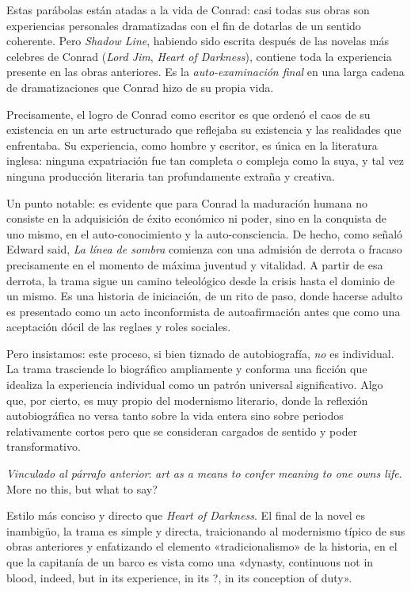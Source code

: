 \documentclass[a4paper, 12pt]{article}
\begin{document}
Estas parábolas están atadas a la vida de Conrad: casi todas sus obras son
experiencias personales dramatizadas con el fin de dotarlas de un sentido
coherente. Pero \textit{Shadow Line}, habiendo sido escrita después de las
novelas más celebres de Conrad (\textit{Lord Jim}, \textit{Heart of Darkness}),
contiene toda la experiencia presente en las obras anteriores. Es la
\textit{auto-examinación final} en una larga cadena de dramatizaciones que
Conrad hizo de su propia vida.

Precisamente, el logro de Conrad como escritor es que ordenó el caos de su
existencia en un arte estructurado que reflejaba su existencia y las realidades
que enfrentaba. Su experiencia, como hombre y escritor, es única en la
literatura inglesa: ninguna expatriación fue tan completa o compleja como la
suya, y tal vez ninguna producción literaria tan profundamente extraña y
creativa.

Un punto notable: es evidente que para Conrad la maduración humana no consiste
en la adquisición de éxito económico ni poder, sino en la conquista de uno
mismo, en el auto-conocimiento y la auto-consciencia. De hecho, como señaló
Edward said, \textit{La línea de sombra} comienza con una admisión de derrota o
fracaso precisamente en el momento de máxima juventud y vitalidad. A partir de
esa derrota, la trama sigue un camino teleológico desde la crisis hasta el
dominio de un mismo. Es una historia de iniciación, de un rito de paso, donde
hacerse adulto es presentado como un acto inconformista de autoafirmación antes
que como una aceptación dócil de las reglaes y roles sociales. 



Pero insistamos: este proceso, si bien tiznado de autobiografía, \textit{no} es
individual. La trama trasciende lo biográfico ampliamente y conforma una ficción
que idealiza la experiencia individual como un patrón universal significativo.
Algo que, por cierto, es muy propio del modernismo literario, donde la reflexión
autobiográfica no versa tanto sobre la vida entera sino sobre periodos
relativamente cortos pero que se consideran cargados de sentido y poder
transformativo.

\textit{Vinculado al párrafo anterior}: \textit{art as a means to confer meaning
to one owns life}. More no this, but what to say?

Estilo más conciso y directo que \textit{Heart of Darkness}. El final de la
novel es inambigüo, la trama es simple y directa, traicionando al modernismo
típico de sus obras anteriores y enfatizando el elemento «tradicionalismo» de la
historia, en el que la capitanía de un barco es vista como una «dynasty,
continuous not in blood, indeed, but in its experience, in its ?, in its
conception of duty».
\end{document}
